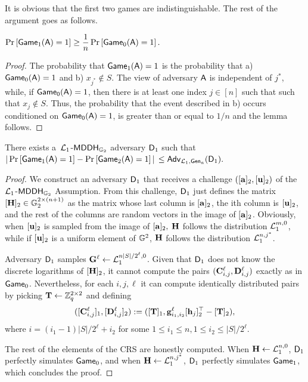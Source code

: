 It is obvious that the first two games are indistinguishable. The rest of the argument goes as follows.

\begin{lemma}
$\Pr\left[ \mathsf{Game}_1(\mathsf{A})=1\right]\geq\dfrac{1}{n}\Pr\left[\mathsf{Game}_0(\mathsf{A})=1\right].$
\end{lemma}

\begin{proof}  The probability that
 $\mathsf{Game}_1(\mathsf{A})=1$ is the probability that  a) $\mathsf{Game}_0(\mathsf{A})=1$ and
b)  $x_{j^*} \notin S$. The view of adversary $\mathsf{A}$ is independent of $j^*$, while, if $\mathsf{Game_0}(\mathsf{A})=1$, then there is at least one index $j \in [n]$ such that  
such that  $x_{j} \notin S$. Thus, 
the probability that the event described in b) occurs conditioned on $\mathsf{Game_0}(\mathsf{A})=1$, is greater than or equal to $1/n$ and the lemma follows.
\end{proof}

\begin{lemma} There exists a\ $\mathcal{L}_1$-$\mathsf{MDDH}_{\mathbb{G}_2}$ adversary $\mathsf{D}_1$ such that
$|\Pr\left[\mathsf{Game}_{1}(\advA)=1\right]\linebreak-\Pr\left[\mathsf{Game}_{2}(\advA)=1\right]|$ $\leq \mathsf{Adv}_{\mathcal{L}_1,\mathsf{Gen}_a}(\mathsf{D}_1).$
\end{lemma}
\begin{proof}
We construct an adversary $\mathsf{D}_1$ that receives 
a challenge $([\mathbf{a}]_2,[\mathbf{u}]_2)$ of the 
$\mathcal{L}_1$-$\mathsf{MDDH}_{\mathbb{G}_2}$ Assumption. From this challenge, $\mathsf{D}_1$ just defines the matrix  $[\mathbf{{H}}]_2\in\mathbb{G}_2^{2\times(n+1)}$ as the matrix whose last column is $[\mathbf{a}]_2$, the ith column is $[\mathbf{u}]_2$, and the rest of the columns are random vectors in the image of $[\mathbf{a}]_2$. 
Obviously, when $[\mathbf{u}]_2$ is sampled from 
the image of $[\mathbf{a}]_2,$ $\mathbf{{H}}$ follows the distribution $\mathcal{L}_1^{m,0}$, while if $[\mathbf{u}]_2$ is a uniform element of $\mathbb{G}^2$, $\mathbf{{H}}$ follows the distribution $\mathcal{L}_1^{n,j^*}$. 
 
Adversary $\mathsf{D}_1$ samples
$\mathbf{{G}}^\ell \gets \mathcal{L}_1^{n|S|/2^\ell,0}$. Given that $\mathsf{D}_1$ does not know the discrete logarithms of $[\mathbf{{H}}]_2$, it cannot compute the pairs $(\mathbf{{C}}^\ell_{i,j},\mathbf{{D}}^\ell_{i,j})$ exactly as in $\mathsf{Game}_0$. Nevertheless, for each $i,j,\ell$ it can compute identically distributed pairs by picking $\mathbf{{T}}\gets\mathbb{Z}_q^{2\times 2}$ and defining
$$
([\mathbf{{C}}^\ell_{i,j}]_1,[\mathbf{{D}}^\ell_{i,j}]_2):=([\mathbf{{T}}]_1,\mathbf{g}_{i_1,i_2}^\ell[\mathbf{h}_j]_2^\top-[\mathbf{{T}}]_2),
$$
where $i=(i_1-1)|S|/2^\ell+i_2$ for some $1\leq i_1\leq n,1\leq i_2 \leq |S|/2^\ell$.

The rest of the elements of the CRS are honestly computed. When $\mathbf{{H}}\gets\mathcal{L}_1^{n,0}$, $\mathsf{D}_1$ perfectly simulates $\mathsf{Game}_0$, and when $\mathbf{{H}}\gets\mathcal{L}_1^{n,j^*}$, $\mathsf{D}_1$ perfectly simulates $\mathsf{Game}_1$, which concludes the proof. 
\end{proof}

